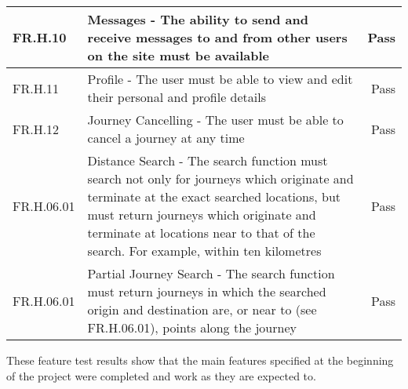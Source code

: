\begin{tabular}{| l | p{9cm} | r |}
\hline
FR.H.10 & Messages - The ability to send and receive messages to and from other users on the site must be available & Pass \\
\hline
FR.H.11 & Profile - The user must be able to view and edit their personal and profile details & Pass \\
\hline
FR.H.12 & Journey Cancelling - The user must be able to cancel a journey at any time & Pass \\
\hline
FR.H.06.01 & Distance Search - The search function must search not only for journeys which originate and terminate at the exact searched locations, but must return journeys which originate and terminate at locations near to that of the search. For example, within ten kilometres & Pass \\
\hline
FR.H.06.01 & Partial Journey Search - The search function must return journeys in which the searched origin and destination are, or near to (see FR.H.06.01), points along the journey & Pass \\
\hline
\end{tabular}

These feature test results show that the main features specified at the beginning of the project were completed and work as they are expected to. 








